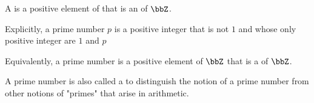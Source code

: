 \begin{definition} \label{definition:prime_number}
    A  is a positive element of  that is an  of $\bbZ$. 

    Explicitly, a prime number $p$ is a positive integer that is not $1$ and whose only positive integer  are $1$ and $p$
    
    Equivalently, a prime number is a positive element of $\bbZ$ that is a  of $\bbZ$.

    A prime number is also called a  to distinguish the notion of a prime number from other notions of "primes" that arise in arithmetic.

\end{definition}